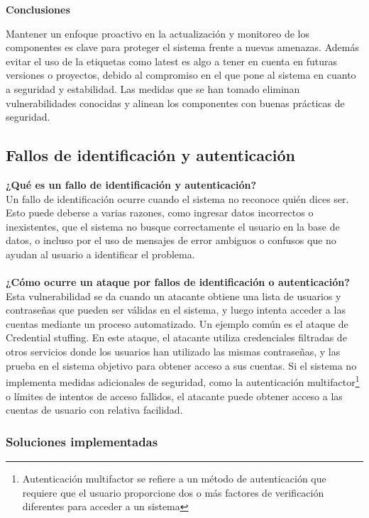 \documentclass[a4paper,12pt]{article}
\begin{document}
\textbf{Conclusiones}

Mantener un enfoque proactivo en la actualización y monitoreo de los componentes es clave para proteger el sistema frente a nuevas amenazas. Además evitar el uso de la etiquetas como latest es algo a tener en cuenta en futuras versiones o proyectos, debido al compromiso en el que pone al sistema en cuanto a seguridad y estabilidad. Las medidas que se han tomado eliminan vulnerabilidades conocidas y alinean los componentes con buenas prácticas de seguridad.

\vspace{1em}
\subsection{Fallos de identificación y autenticación}
\vspace{1em}
\textbf{¿Qué es un fallo de identificación y autenticación?\\}
Un fallo de identificación ocurre cuando el sistema no reconoce quién dices ser. Esto puede deberse a varias razones, como ingresar datos incorrectos o inexistentes, que el sistema no busque correctamente el usuario en la base de datos, o incluso por el uso de mensajes de error ambiguos o confusos que no ayudan al usuario a identificar el problema. \\ \\
\textbf{¿Cómo ocurre un ataque por fallos de identificación o autenticación?\\}
Esta vulnerabilidad se da cuando un atacante obtiene una lista de usuarios y contraseñas que pueden ser válidas en el sistema, y luego intenta acceder a las cuentas mediante un proceso automatizado. Un ejemplo común es el ataque de Credential stuffing. En este ataque, el atacante utiliza credenciales filtradas de otros servicios donde los usuarios han utilizado las mismas contraseñas, y las prueba en el sistema objetivo para obtener acceso a sus cuentas. Si el sistema no implementa medidas adicionales de seguridad, como la autenticación multifactor\footnote{Autenticación multifactor se refiere a un método de autenticación que requiere que el usuario proporcione dos o más factores de verificación diferentes para acceder a un sistema} o límites de intentos de acceso fallidos, el atacante puede obtener acceso a las cuentas de usuario con relativa facilidad.
\vspace{1em}
\subsubsection{Soluciones implementadas}
\end{document}

